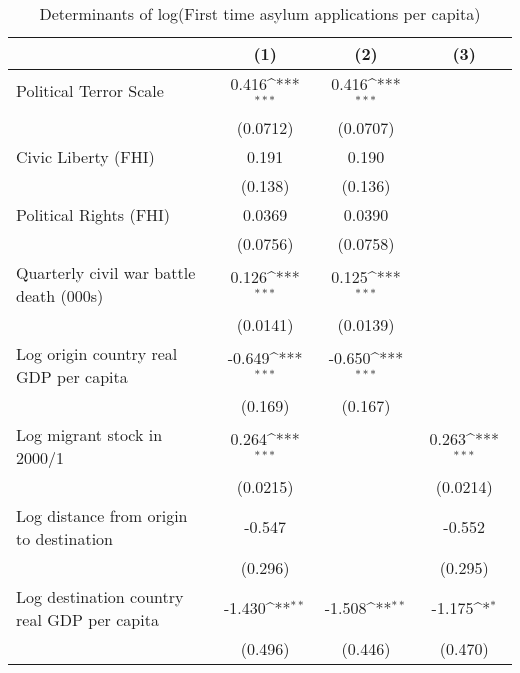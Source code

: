 \begin{table}[htbp]\centering
\def\sym#1{\ifmmode^{#1}\else\(^{#1}\)\fi}
\caption{Determinants of log(First time asylum applications per capita)}
\begin{tabular}{l*{3}{c}}
\hline\hline
                    &\multicolumn{1}{c}{(1)}         &\multicolumn{1}{c}{(2)}         &\multicolumn{1}{c}{(3)}         \\
\hline
Political Terror Scale&       0.416\sym{***}&       0.416\sym{***}&                     \\
                    &    (0.0712)         &    (0.0707)         &                     \\
[1em]
Civic Liberty (FHI) &       0.191         &       0.190         &                     \\
                    &     (0.138)         &     (0.136)         &                     \\
[1em]
Political Rights (FHI)&      0.0369         &      0.0390         &                     \\
                    &    (0.0756)         &    (0.0758)         &                     \\
[1em]
Quarterly civil war battle death (000s)&       0.126\sym{***}&       0.125\sym{***}&                     \\
                    &    (0.0141)         &    (0.0139)         &                     \\
[1em]
Log origin country real GDP per capita&      -0.649\sym{***}&      -0.650\sym{***}&                     \\
                    &     (0.169)         &     (0.167)         &                     \\
[1em]
Log migrant stock in 2000/1&       0.264\sym{***}&                     &       0.263\sym{***}\\
                    &    (0.0215)         &                     &    (0.0214)         \\
[1em]
Log distance from origin to destination&      -0.547         &                     &      -0.552         \\
                    &     (0.296)         &                     &     (0.295)         \\
[1em]
Log destination country real GDP per capita&      -1.430\sym{**} &      -1.508\sym{**} &      -1.175\sym{*}  \\
                    &     (0.496)         &     (0.446)         &     (0.470)         \\

\end{tabular}
\end{table}
